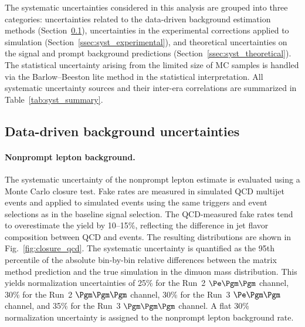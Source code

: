 The systematic uncertainties considered in this analysis are grouped into three categories: uncertainties related to the data-driven background estimation methods (Section~\ref{ssec:syst_datadriven}), uncertainties in the experimental corrections applied to simulation (Section~\ref{ssec:syst_experimental}), and theoretical uncertainties on the signal and prompt background predictions (Section~\ref{ssec:syst_theoretical}). The statistical uncertainty arising from the limited size of MC samples is handled via the Barlow--Beeston lite method in the statistical interpretation. All systematic uncertainty sources and their inter-era correlations are summarized in Table~\ref{tab:syst_summary}.

\subsection{Data-driven background uncertainties}
\label{ssec:syst_datadriven}

\paragraph{Nonprompt lepton background.}
The systematic uncertainty of the nonprompt lepton estimate is evaluated using a Monte Carlo closure test. Fake rates are measured in simulated QCD multijet events and applied to simulated \ttbar events using the same triggers and event selections as in the baseline signal selection. The QCD-measured fake rates tend to overestimate the \ttbar yield by 10--15\%, reflecting the difference in jet flavor composition between QCD and \ttbar events. The resulting distributions are shown in Fig.~\ref{fig:closure_qcd}. The systematic uncertainty is quantified as the 95th percentile of the absolute bin-by-bin relative differences between the matrix method prediction and the true \ttbar simulation in the dimuon mass distribution. This yields normalization uncertainties of 25\% for the Run~2 $\Pe\Pgm\Pgm$ channel, 30\% for the Run~2 $\Pgm\Pgm\Pgm$ channel, 30\% for the Run~3 $\Pe\Pgm\Pgm$ channel, and 35\% for the Run~3 $\Pgm\Pgm\Pgm$ channel. A flat 30\% normalization uncertainty is assigned to the nonprompt lepton background rate.

